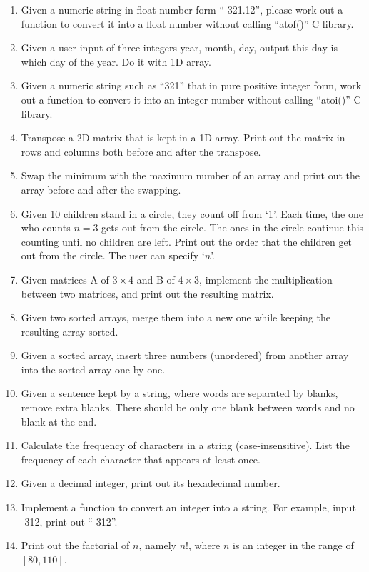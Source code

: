\documentclass[11pt]{article}
\begin{document}
\begin{enumerate}
    \item Given a numeric string in float number form ``-321.12'', please work out a function to convert it into a float number without calling ``atof()'' C library.
    \item Given a user input of three integers year, month, day, output this day is which day of the year. Do it with 1D array.
    \item Given a numeric string such as ``321'' that in pure positive integer form, work out a function to convert it into an integer number without calling “atoi()” C library.
    \item Transpose a 2D matrix that is kept in a 1D array. Print out the matrix in rows and columns both before and after the transpose.
    \item Swap the minimum with the maximum number of an array and print out the array before and after the swapping.
    \item Given 10 children stand in a circle, they count off from `1'. Each time, the one who counts $n=3$ gets out from the circle. The ones in the circle continue this counting until no children are left. Print out the order that the children get out from the circle. The user can specify `$n$'.
    \item Given matrices A of $3{\times}4$ and B of $4{\times}3$, implement the multiplication between two matrices, and print out the resulting matrix.
    \item Given two sorted arrays, merge them into a new one while keeping the resulting array sorted.
    \item Given a sorted array, insert three numbers (unordered) from another array into the sorted array one by one.
    \item Given a sentence kept by a string, where words are separated by blanks, remove extra blanks. There should be only one blank between words and no blank at the end.
    \item Calculate the frequency of characters in a string (case-insensitive). List the frequency of each character that appears at least once.
    \item Given a decimal integer, print out its hexadecimal number.
    \item Implement a function to convert an integer into a string. For example, input -312, print out ``-312''.
    \item Print out the factorial of $n$, namely $n!$, where $n$ is an integer in the range of $[80, 110]$.
\end{enumerate}
\end{document}
